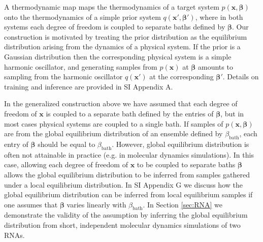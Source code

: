 \documentclass[9pt,twocolumn,twoside]{pnas-new}
\begin{document}


A thermodynamic map maps the thermodynamics of a target system $p(\mathbf{x},\bm{\beta})$ onto the thermodynamics of a simple prior system $q(\mathbf{x}',\bm{\beta}')$, where in both systems each degree of freedom is coupled to separate baths defined by $\bm{\beta}$. Our construction is motivated by treating the prior distribution as the equilibrium distribution arising from the dynamics of a physical system. If the prior is a Gaussian distribution then the corresponding physical system is a simple harmonic oscillator, and generating samples from $p(\mathbf{x})$ at $\bm{\beta}$ amounts to sampling from the harmonic oscillator $q(\mathbf{x}')$ at the corresponding $\bm{\beta}'$. Details on training and inference are provided in SI Appendix A.

In the generalized construction above we have assumed that each degree of freedom of $\mathbf{x}$ is coupled to a separate bath defined by the entries of $\bm{\beta}$, but in most cases physical systems are coupled to a single bath. If samples of $p(\mathbf{x},\bm{\beta})$ are from the global equilibrium distribution of an ensemble defined by $\beta_\mathrm{bath}$, each entry of $\bm{\beta}$ should be equal to $\beta_\mathrm{bath}$. However, global equilibrium distribution is often not attainable in practice (e.g. in molecular dynamics simulations). In this case, allowing each degree of freedom of $\mathbf{x}$ to be coupled to separate baths $\bm{\beta}$ allows the global equilibrium distribution to be inferred from samples gathered under a local equilibrium distribution. In SI Appendix G we discuss how the global equilibrium distribution can be inferred from local equilibrium samples if one assumes that $\bm{\beta}$ varies linearly with $\beta_{\mathrm{bath}}$. In Section \ref{sec:RNA} we demonstrate the validity of the assumption by inferring the global equilibrium distribution from short, independent molecular dynamics simulations of two RNAs.
\end{document}
